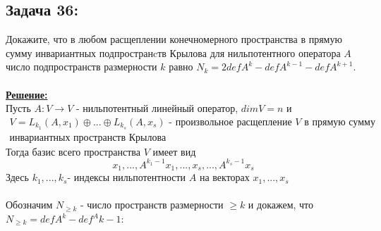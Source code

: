 \documentclass[a4paper,12pt,titlepage,final]{article}
\begin{document}
\subsection*{Задача 36:}
\noindent Докажите, что в любом расщеплении конечномерного пространства в прямую сумму инвариантных 
подпространcтв Крылова для нильпотентного оператора $A$ число подпространств размерности $k$ равно $N_k = 2defA^k - defA^{k - 1} - defA^{k + 1}$. \\ \\
\textbf{\underline{Решение:}} \\
Пусть $A: V \rightarrow V$ - нильпотентный линейный оператор, $dimV = n$ и
\begin{gather*}
    V = L_{k_1}(A, x_1) \oplus ... \oplus L_{k_s}(A, x_s)
    \text{ - произвольное расщепление $V$ в прямую сумму} \\ \text{инвариантных пространств Крылова}
\end{gather*}
Тогда базис всего пространства $V$ имеет вид 
$$x_1, ... , A^{k_1 - 1}x_1, ... , x_s, ... , A^{k_s - 1}x_s$$
Здесь $k_1, ... , k_s \text{- индексы нильпотентности $A$ на векторах $x_1, ... , x_s$}$ \\ \\
Обозначим $N_{\geq k}$ - число пространств размерности $\geq k$ и докажем, что $N_{\geq k} = defA^k - def^A{k - 1}$:
\end{document}
